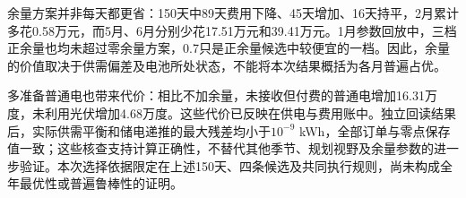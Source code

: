 余量方案并非每天都更省：150天中89天费用下降、45天增加、16天持平，2月累计多花0.58万元，而5月、6月分别少花17.51万元和39.41万元。1月参数回放中，三档正余量也均未超过零余量方案，0.7只是正余量候选中较便宜的一档。因此，余量的价值取决于供需偏差及电池所处状态，不能将本次结果概括为各月普遍占优。

多准备普通电也带来代价：相比不加余量，未接收但付费的普通电增加16.31万度，未利用光伏增加4.68万度。这些代价已反映在供电与费用账中。独立回读结果后，实际供需平衡和储电递推的最大残差均小于$10^{-9}$ kWh，全部订单与零点保存值一致；这些核查支持计算正确性，不替代其他季节、规划视野及余量参数的进一步验证。本次选择依据限定在上述150天、四条候选及共同执行规则，尚未构成全年最优性或普遍鲁棒性的证明。
